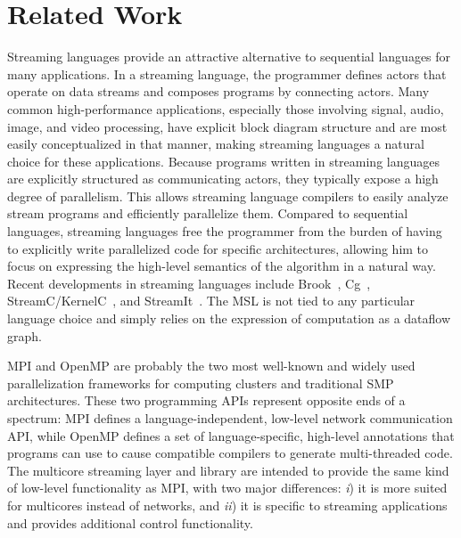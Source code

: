 \section{Related Work}\label{ch:bg}

Streaming languages provide an attractive alternative to sequential
languages for many applications. In a streaming language, the
programmer defines actors that operate on data streams and composes
programs by connecting actors. Many common high-performance
applications, especially those involving signal, audio, image, and
video processing, have explicit block diagram structure and are most
easily conceptualized in that manner, making streaming languages a
natural choice for these applications.
Because programs written in streaming languages are explicitly
structured as communicating actors, they typically expose a high
degree of parallelism. This allows streaming language compilers to
easily analyze stream programs and efficiently parallelize
them. Compared to sequential languages, streaming languages free the
programmer from the burden of having to explicitly write parallelized
code for specific architectures, allowing him to focus on expressing
the high-level semantics of the algorithm in a natural way.
Recent developments in streaming languages include Brook~\cite{brook},
Cg~\cite{cg}, StreamC/KernelC~\cite{streamc}, and StreamIt~\cite{streamitweb}.
The MSL is not tied to any particular language choice and simply
relies on the expression of computation as a dataflow graph.
 
MPI and OpenMP are probably the two most well-known and widely used
parallelization frameworks for computing clusters and traditional SMP
architectures. These two programming APIs represent opposite ends of a
spectrum: MPI defines a language-independent, low-level network
communication API, while OpenMP defines a set of language-specific,
high-level annotations that programs can use to cause compatible
compilers to generate multi-threaded code.  The multicore streaming
layer and library are intended to provide the same kind of low-level
functionality as MPI, with two major differences: \emph{i}) it is more
suited for multicores instead of networks, and \emph{ii}) it is
specific to streaming applications and provides additional control
functionality.

